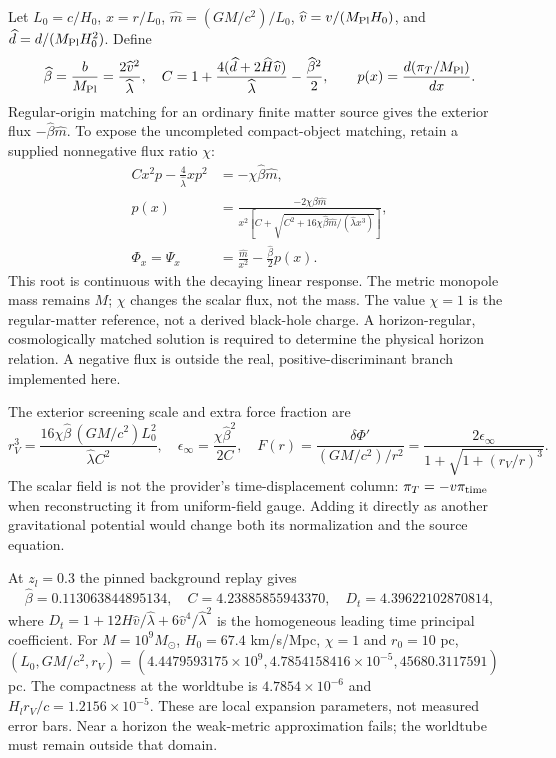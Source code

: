Let $L_0=c/H_0$, $x=r/L_0$, $\widehat m=(GM/c^2)/L_0$,
$\widehat v=v/(M_{\rm Pl}H_0)$, and
$\widehat d=d/(M_{\rm Pl}H_0^2)$. Define
\begin{equation}
 \widehat\beta=\frac b{M_{\rm Pl}}
 =\frac{2\widehat v^2}{\widehat\lambda},\quad
 C=1+\frac{4(\widehat d+2\widehat H\widehat v)}{\widehat\lambda}
 -\frac{\widehat\beta^2}{2},\qquad
 p(x)=\frac{d(\pi_T/M_{\rm Pl})}{dx}.
 \label{eq:ext-beta}
\end{equation}
Regular-origin matching for an ordinary finite matter source gives the
exterior flux $-\widehat\beta\widehat m$. To expose the uncompleted
compact-object matching, retain a supplied nonnegative flux ratio $\chi$:
\begin{align}
 Cx^2p-\frac4{\widehat\lambda}xp^2
 &=-\chi\widehat\beta\widehat m,\nonumber\\
 p(x)&=\frac{-2\chi\widehat\beta\widehat m}
 {x^2\left[C+\sqrt{C^2+16\chi\widehat\beta\widehat m/
 (\widehat\lambda x^3)}\right]},\nonumber\\
 \Phi_x=\Psi_x&=\frac{\widehat m}{x^2}
 -\frac{\widehat\beta}{2}p(x).
 \label{eq:ext-radial-branch}
\end{align}
This root is continuous with the decaying linear response. The metric
monopole mass remains $M$; $\chi$ changes the scalar flux, not the mass.
The value $\chi=1$ is the regular-matter reference, not a derived
black-hole charge. A horizon-regular, cosmologically matched solution is
required to determine the physical horizon relation. A negative flux is
outside the real, positive-discriminant branch implemented here.

The exterior screening scale and extra force fraction are
\begin{equation}
 r_V^3=\frac{16\chi\widehat\beta\,(GM/c^2)L_0^2}
 {\widehat\lambda C^2},\quad
 \epsilon_\infty=\frac{\chi\widehat\beta^2}{2C},\quad
 F(r)=\frac{\delta\Phi'}{(GM/c^2)/r^2}
 =\frac{2\epsilon_\infty}{1+\sqrt{1+(r_V/r)^3}}.
 \label{eq:ext-screening}
\end{equation}
The scalar field is not the provider's time-displacement column:
$\pi_T=-v\pi_{\rm time}$ when reconstructing it from uniform-field gauge.
Adding it directly as another gravitational potential would change both
its normalization and the source equation.

At $z_l=0.3$ the pinned background replay gives
\begin{equation}
 \widehat\beta=0.113063844895134,
 \quad C=4.23885855943370,
 \quad D_t=4.39622102870814,
 \label{eq:ext-coeff-values}
\end{equation}
where $D_t=1+12\widehat H\widehat v/\widehat\lambda
+6\widehat v^4/\widehat\lambda^2$ is the homogeneous leading time
principal coefficient. For $M=10^9M_\odot$, $H_0=67.4$ km/s/Mpc,
$\chi=1$ and $r_0=10$ pc,
$(L_0,GM/c^2,r_V)=(4.4479593175\times10^9,
4.7854158416\times10^{-5},45680.3117591)$ pc.
The compactness at the worldtube is $4.7854\times10^{-6}$ and
$H_lr_V/c=1.2156\times10^{-5}$. These are local expansion parameters,
not measured error bars. Near a horizon the weak-metric approximation
fails; the worldtube must remain outside that domain.

